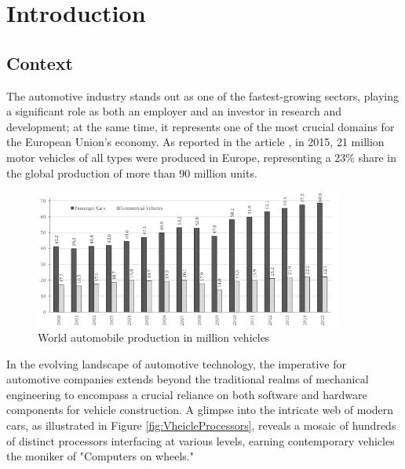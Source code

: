 \hypersetup{
    colorlinks=true,
    linkcolor=blue
}

\chapter{Introduction} \label{ch:introduction}

\section{Context}
The automotive industry stands out as one of the fastest-growing sectors, playing a significant role as both an employer and an investor in research and development; at the same time, it represents one of the most crucial domains for the European Union's economy. As reported in the article \cite{automotiveInCentralEurope}, in 2015, 21 million motor vehicles of all types were produced in Europe, representing a 23\% share in the global production of more than 90 million units.

\begin{figure}[h]  %
  \centering
  \includegraphics[width=0.9\textwidth]{images/automotive_world production.png}  %
  \caption{World automobile production in million vehicles \cite{automotiveInCentralEurope}}
  \label{fig:WorldAutomobileProduction}
\end{figure}

In the evolving landscape of automotive technology, the imperative for automotive companies extends beyond the traditional realms of mechanical engineering to encompass a crucial reliance on both software and hardware components for vehicle construction. A glimpse into the intricate web of modern cars, as illustrated in Figure \ref{fig:VheicleProcessors}, reveals a mosaic of hundreds of distinct processors interfacing at various levels, earning contemporary vehicles the moniker of "Computers on wheels."

